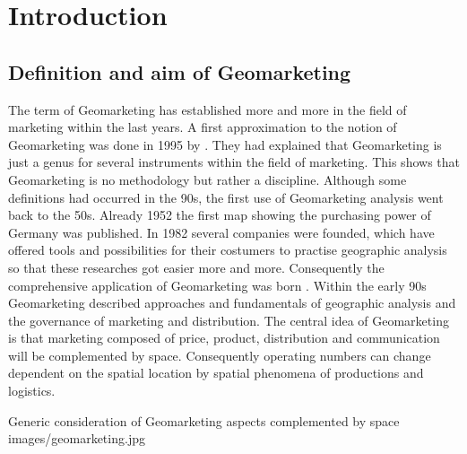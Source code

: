 \section{Introduction}

\subsection{Definition and aim of Geomarketing}
The term of Geomarketing has established more and more in the field of marketing within the last years.  A first approximation to the notion of Geomarketing was done in 1995 by \citeauthor{fruehling}. They had explained that Geomarketing is just a genus for several instruments within the field of marketing. This shows that Geomarketing is no methodology but rather a discipline. Although some definitions had occurred in the 90s, the first use of Geomarketing analysis went back to the 50s. Already 1952 the first map showing the purchasing power of Germany was published. In 1982 several companies were founded, which have offered tools and possibilities for their costumers to practise geographic analysis so that these researches got easier more and more. Consequently the comprehensive application of Geomarketing was born \cite{herter}. Within the early 90s Geomarketing described approaches and fundamentals of geographic analysis and the governance of marketing and distribution. The central idea of Geomarketing is that marketing composed of price, product, distribution and communication will be complemented by space. Consequently operating numbers can change dependent on the spatial location by spatial phenomena of productions and logistics.   


\begin{figureOwn}{Generic consideration of Geomarketing aspects complemented by space \cite{herter}}{images/geomarketing.jpg}\end{figureOwn}

